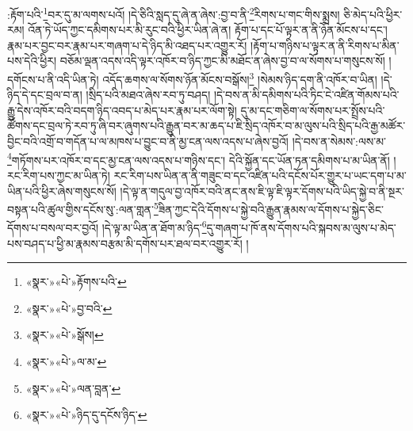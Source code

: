 :རྟོག་པའི་\footnote{«སྣར་»«པེ་»རྟོགས་པའི་}བར་དུ་མ་ལགས་པའོ། །དེ་ཅིའི་སླད་དུ་ཞེ་ན་ཞེས་:བྱ་བ་ནི་\footnote{«སྣར་»«པེ་»བྱ་བའི་}རིགས་པ་གང་གིས་སྨྲས། ཅི་མེད་པའི་ཕྱིར་རམ། འོན་ཏེ་ཡོད་ཀྱང་དམིགས་པར་མི་རུང་བའི་ཕྱིར་ཡིན་ཞེ་ན། རྟོག་པ་དང་པོ་ལྟར་ན་ནི་ཉོན་མོངས་པ་དང་། རྣམ་པར་བྱང་བར་རྣམ་པར་གཞག་པ་དེ་ཉིད་མི་འཐད་པར་འགྱུར་རོ། །རྟོག་པ་གཉིས་པ་ལྟར་ན་ནི་རིགས་པ་མིན་པས་དེའི་ཕྱིར། བཅོམ་ལྡན་འདས་འདི་ལྟར་འཁོར་བ་ཉིད་ཀྱང་མི་མཐོང་ན་ཞེས་བྱ་བ་ལ་སོགས་པ་གསུངས་སོ། །དགོངས་པ་ནི་འདི་ཡིན་ཏེ། འདོད་ཆགས་ལ་སོགས་ཉོན་མོངས་བསྒོས།\footnote{«སྣར་»«པེ་»སྒོས།} །སེམས་ཉིད་དག་ནི་འཁོར་བ་ཡིན། །དེ་ཉིད་དེ་དང་བྲལ་བ་ན། །སྲིད་པའི་མཐའ་ཞེས་རབ་ཏུ་བཤད། །དེ་བས་ན་མི་དམིགས་པའི་ཏིང་ངེ་འཛིན་གོམས་པའི་རྒྱུ་དེས་འཁོར་བའི་བདག་ཉིད་འབད་པ་མེད་པར་རྣམ་པར་ལོག་སྟེ། དུ་མ་དང་གཅིག་ལ་སོགས་པར་སྤྲོས་པའི་ཚོགས་དང་བྲལ་ཏེ་རབ་ཏུ་ཞི་བར་ཞུགས་པའི་རྒྱུན་བར་མ་ཆད་པ་ཇི་སྲིད་འཁོར་བ་མ་ལུས་པའི་སྲིད་པའི་རྒྱ་མཚོར་བྱིང་བའི་འགྲོ་བ་གདོན་པ་ལ་མཁས་པ་བྱུང་བ་ནི་མྱ་ངན་ལས་འདས་པ་ཞེས་བྱའོ། །དེ་བས་ན་སེམས་:ལས་མ་\footnote{«སྣར་»«པེ་»ལ་མ་}གཏོགས་པར་འཁོར་བ་དང་མྱ་ངན་ལས་འདས་པ་གཉིས་དང་། དེའི་སྐྱོན་དང་ཡོན་ཏན་དམིགས་པ་མ་ཡིན་ནོ། །རང་རིག་པས་ཀྱང་མ་ཡིན་ཏེ། རང་རིག་པས་ཡིན་ན་ནི་གཟུང་བ་དང་འཛིན་པའི་དངོས་པོར་གྱུར་པ་ཡང་དག་པ་མ་ཡིན་པའི་ཕྱིར་ཞེས་གསུངས་སོ། །དེ་ལྟ་ན་གདུལ་བྱ་འཁོར་བའི་ནང་ནས་ཇི་ལྟ་ཇི་ལྟར་དོགས་པའི་ཡིད་སྐྱེ་བ་ནི་སྔར་བསྟན་པའི་ཚུལ་གྱིས་དངོས་སུ་:ལན་གླན་\footnote{«སྣར་»«པེ་»ལན་བླན་}ཟིན་ཀྱང་དེའི་དོགས་པ་སྐྱེ་བའི་རྒྱུན་རྣམས་ལ་དོགས་པ་སྐྱེད་ཅིང་དོགས་པ་བསལ་བར་བྱའོ། །དེ་ལྟ་མ་ཡིན་ན་ཐོག་མ་ཉིད་\footnote{«སྣར་»«པེ་»ཉིད་དུ་དངོས་ཉིད་}དུ་གཞག་པ་ཁོ་ནས་དོགས་པའི་སྐབས་མ་ལུས་པ་མེད་པས་བཤད་པ་ཕྱི་མ་རྣམས་བརྩམ་མི་དགོས་པར་ཐལ་བར་འགྱུར་རོ། །
